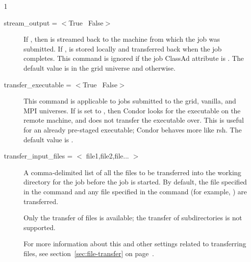 \begin{ManPage}{\label{man-condor-submit}}{1}
\begin{description}
\item[stream\_output = $<$True \Bar\ False$>$]
If , then  is streamed back to
the machine from which the job was submitted.
If ,  is stored locally
and transferred back when the job completes.
This command is ignored if the job ClassAd attribute
 is
.
The default value is  in the grid
universe and  otherwise.


\item[transfer\_executable = $<$True \Bar\ False$>$]
This command is applicable to jobs submitted to the grid,
vanilla, and MPI universes.
If  is set to
, then Condor looks for the executable on the remote machine, and
does not transfer the executable over.
This is useful for an already pre-staged 
executable; Condor behaves more like rsh.
The default value is .


\item[transfer\_input\_files = $<$ file1,file2,file... $>$]
A comma-delimited list of all the files to be transferred into the
working directory for the job before the job is started.
By default, the file specified in the
 command and any file specified in the 
command (for example, ) are transferred.

Only the transfer of files is available; the transfer of
subdirectories is not supported.

For more information about this and other settings related to
transferring files, see section~\ref{sec:file-transfer} on
page~\pageref{sec:file-transfer}.



\end{description}
\end{ManPage}
